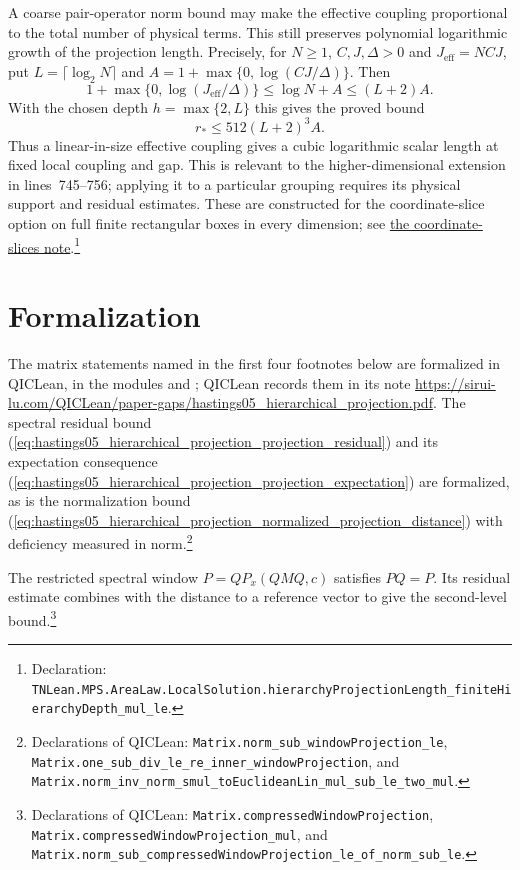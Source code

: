 \documentclass{article}
\providecommand{\leanid}[1]{\nolinkurl{#1}}
\begin{document}
A coarse pair-operator norm bound may make the effective coupling
proportional to the total number of physical terms. This still preserves
polynomial logarithmic growth of the projection length. Precisely, for
$N\ge1$, $C,J,\Delta>0$ and $J_{\mathrm{eff}}=NCJ$, put
$L=\lceil\log_2N\rceil$ and $A=1+\max\{0,\log(CJ/\Delta)\}$. Then
\[
 1+\max\{0,\log(J_{\mathrm{eff}}/\Delta)\}
 \le\log N+A\le(L+2)A.
\]
With the chosen depth $h=\max\{2,L\}$ this gives the proved bound
\[
 r_*\le512(L+2)^3 A.
\]
Thus a linear-in-size effective coupling gives a cubic logarithmic
scalar length at fixed local coupling and gap. This is relevant to the
higher-dimensional extension in lines~745--756; applying it to a
particular grouping requires its physical support and residual estimates.
These are constructed for the coordinate-slice option on full finite
rectangular boxes in every dimension; see
\href{hastings05_coordinate_slices.pdf}{the coordinate-slices note}.\footnote{Declaration:
\leanid{TNLean.MPS.AreaLaw.LocalSolution.hierarchyProjectionLength_finiteHierarchyDepth_mul_le}.}

\section{Formalization}

The matrix statements named in the first four footnotes below are formalized in QICLean, in
the modules
 and
; QICLean records them in its note
\url{https://sirui-lu.com/QICLean/paper-gaps/hastings05_hierarchical_projection.pdf}.
The spectral residual bound (\ref{eq:hastings05_hierarchical_projection_projection_residual}) and its expectation consequence
(\ref{eq:hastings05_hierarchical_projection_projection_expectation}) are formalized, as is the normalization bound
(\ref{eq:hastings05_hierarchical_projection_normalized_projection_distance}) with deficiency measured in norm.\footnote{Declarations of QICLean:
    \leanid{Matrix.norm_sub_windowProjection_le},
    \leanid{Matrix.one_sub_div_le_re_inner_windowProjection}, and
    \leanid{Matrix.norm_inv_norm_smul_toEuclideanLin_mul_sub_le_two_mul}.}

The restricted spectral window $P=QP_x(QMQ,c)$ satisfies $PQ=P$.
Its residual estimate combines with the distance to a reference vector
to give the second-level bound.\footnote{Declarations of QICLean:
    \leanid{Matrix.compressedWindowProjection},
    \leanid{Matrix.compressedWindowProjection_mul}, and
    \leanid{Matrix.norm_sub_compressedWindowProjection_le_of_norm_sub_le}.}
\end{document}

